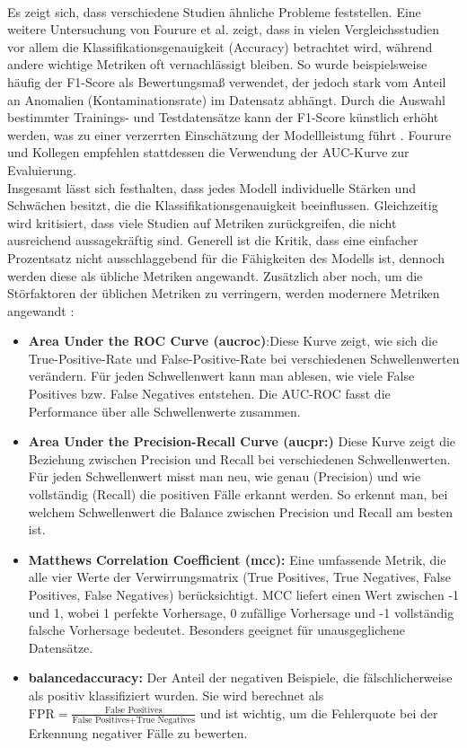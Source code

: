 \documentclass[a4paper,12pt]{article}
\begin{document}
	\\[0.5em]
	Es zeigt sich, dass verschiedene Studien ähnliche Probleme feststellen. Eine weitere Untersuchung von Fourure et al. zeigt, dass in vielen Vergleichsstudien vor allem die Klassifikationsgenauigkeit (Accuracy) betrachtet wird, während andere wichtige Metriken oft vernachlässigt bleiben. So wurde beispielsweise häufig der F1-Score als Bewertungsmaß verwendet, der jedoch stark vom Anteil an Anomalien (Kontaminationsrate) im Datensatz abhängt. Durch die Auswahl bestimmter Trainings- und Testdatensätze kann der F1-Score künstlich erhöht werden, was zu einer verzerrten Einschätzung der Modellleistung führt \cite{fourure2021anomaly}. Fourure und Kollegen empfehlen stattdessen die Verwendung der AUC-Kurve zur Evaluierung.
	\\[0.5em]
	Insgesamt lässt sich festhalten, dass jedes Modell individuelle Stärken und Schwächen besitzt, die die Klassifikationsgenauigkeit beeinflussen. Gleichzeitig wird kritisiert, dass viele Studien auf Metriken zurückgreifen, die nicht ausreichend aussagekräftig sind.
	Generell ist die Kritik, dass eine einfacher Prozentsatz nicht ausschlaggebend für die Fähigkeiten des Modells ist, dennoch werden diese als übliche Metriken angewandt. Zusätzlich aber noch, um die Störfaktoren der üblichen Metriken zu verringern, werden modernere Metriken angewandt \cite{michelucci2022introduction}:
	
	\begin{itemize}
		\item \textbf{Area Under the ROC Curve (\gls{aucroc})}:Diese Kurve zeigt, wie sich die True-Positive-Rate und False-Positive-Rate bei verschiedenen Schwellenwerten verändern. Für jeden Schwellenwert kann man ablesen, wie viele False Positives bzw. False Negatives entstehen. Die AUC-ROC fasst die Performance über alle Schwellenwerte zusammen.
		\item \textbf{Area Under the Precision-Recall Curve (\gls{aucpr}:)} Diese Kurve zeigt die Beziehung zwischen Precision und Recall bei verschiedenen Schwellenwerten. Für jeden Schwellenwert misst man neu, wie genau (Precision) und wie vollständig (Recall) die positiven Fälle erkannt werden. So erkennt man, bei welchem Schwellenwert die Balance zwischen Precision und Recall am besten ist.
		\item \textbf{Matthews Correlation Coefficient (\gls{mcc}):} Eine umfassende Metrik, die alle vier Werte der Verwirrungsmatrix (True Positives, True Negatives, False Positives, False Negatives) berücksichtigt. MCC liefert einen Wert zwischen -1 und 1, wobei 1 perfekte Vorhersage, 0 zufällige Vorhersage und -1 vollständig falsche Vorhersage bedeutet. Besonders geeignet für unausgeglichene Datensätze.
		\item \textbf{\gls{balancedaccuracy}:} Der Anteil der negativen Beispiele, die fälschlicherweise als positiv klassifiziert wurden. Sie wird berechnet als \(\text{FPR} = \frac{\text{False Positives}}{\text{False Positives} + \text{True Negatives}}\) und ist wichtig, um die Fehlerquote bei der Erkennung negativer Fälle zu bewerten.
	\end{itemize}
	
\end{document}
